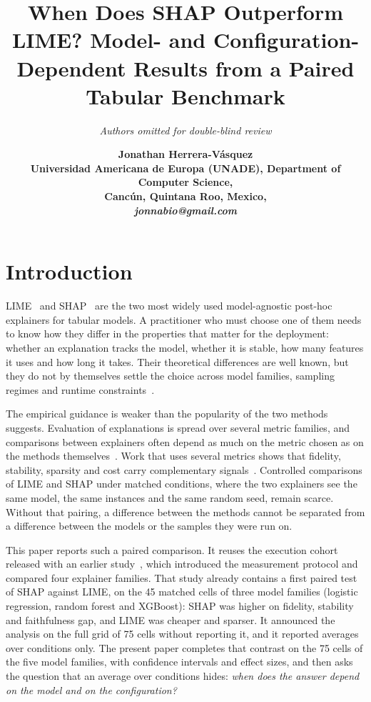 \documentclass{cleiej}
\title{When Does SHAP Outperform LIME? Model- and Configuration-Dependent
Results from a Paired Tabular Benchmark}
\author{\it Authors omitted for double-blind review}
\author{
\bf Jonathan Herrera-V\'asquez\\
Universidad Americana de Europa (UNADE), Department of Computer Science,\\
Canc\'un, Quintana Roo, Mexico,\\
\it jonnabio@gmail.com
}
\begin{document}
\maketitle

\begin{abstract}
\noindent

\end{abstract}


\section{Introduction}
\label{sec:intro}

LIME~\cite{ribeiro2016why} and SHAP~\cite{lundberg2017unified} are the two
most widely used model-agnostic post-hoc explainers for tabular models. A
practitioner who must choose one of them needs to know how they differ in
the properties that matter for the deployment: whether an explanation tracks
the model, whether it is stable, how many features it uses and how long it
takes. Their theoretical differences are well known, but they do not by
themselves settle the choice across model families, sampling regimes and
runtime constraints~\cite{retzlaff2024posthoc,ali2023trustworthy}.

The empirical guidance is weaker than the popularity of the two methods
suggests. Evaluation of explanations is spread over several metric
families, and comparisons between explainers often depend as much on the
metric chosen as on the methods
themselves~\cite{nauta2023anecdotal,canha2025benchmark,longo2024manifesto}.
Work that uses several metrics shows that fidelity, stability, sparsity and
cost carry complementary
signals~\cite{pawlicki2024metrics,zheng2025ffidelity}. Controlled
comparisons of LIME and SHAP under matched conditions, where the two
explainers see the same model, the same instances and the same random seed,
remain scarce. Without that pairing, a difference between the methods cannot
be separated from a difference between the models or the samples they were
run on.

This paper reports such a paired comparison. It reuses the execution cohort
released with an earlier study~\cite{herrera2026framework}, which introduced
the measurement protocol and compared four explainer families. That study
already contains a first paired test of SHAP against LIME, on the 45 matched
cells of three model families (logistic regression, random forest and
XGBoost): SHAP was higher on fidelity, stability and faithfulness gap, and
LIME was cheaper and sparser. It announced the analysis on the full grid of
75 cells without reporting it, and it reported averages over conditions
only. The present paper completes that contrast on the 75 cells of the five
model families, with confidence intervals and effect sizes, and then asks
the question that an average over conditions hides: \emph{when does the
answer depend on the model and on the configuration?}
\end{document}
